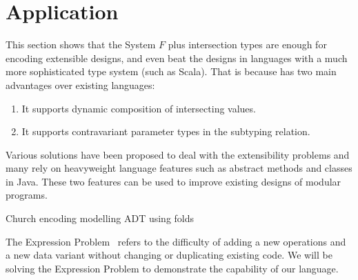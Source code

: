 \section{Application} \label{sec:application}


This section shows that the System $ F $ plus intersection types are enough for
encoding extensible designs, and even beat the designs in languages with a much
more sophisticated type system (such as Scala). That is because \name has two
main advantages over existing languages:

\begin{enumerate}
\item It supports dynamic composition of intersecting values.
\item It supports contravariant parameter types in the subtyping relation.
\end{enumerate}

Various solutions have been proposed to deal with the extensibility problems and
many rely on heavyweight language features such as abstract methods and classes
in Java. These two features can be used to improve existing designs of modular
programs.


Church encoding modelling ADT using folds


The Expression Problem~\cite{wadler1998expression} refers to the difficulty of
adding a new operations and a new data variant without changing or duplicating
existing code. We will be solving the Expression Problem to demonstrate the
capability of our language.







